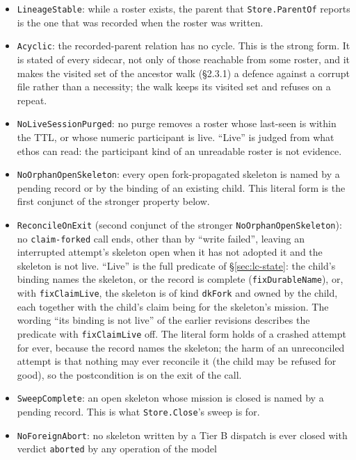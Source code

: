\documentclass[a4paper,10pt,fleqn]{article}
\newcommand{\field}[1]{\texttt{#1}}
\begin{document}
\begin{itemize}
  \item \field{LineageStable}: while a roster exists, the parent that
    \field{Store.ParentOf} reports is the one that was recorded when the
    roster was written.
  \item \field{Acyclic}: the recorded-parent relation has no cycle. This is
    the strong form. It is stated of every sidecar, not only of those
    reachable from some roster, and it makes the visited set of the
    ancestor walk (\S2.3.1) a defence against a corrupt file rather than a
    necessity; the walk keeps its visited set and refuses on a repeat.
  \item \field{NoLiveSessionPurged}: no purge removes a roster whose
    last-seen is within the TTL, or whose numeric participant is live.
    ``Live'' is judged from what ethos can read: the participant kind of an
    unreadable roster is not evidence.
  \item \field{NoOrphanOpenSkeleton}: every open fork-propagated skeleton is
    named by a pending record or by the binding of an existing child. This
    literal form is the first conjunct of the stronger property below.
  \item \field{ReconcileOnExit} (second conjunct of the stronger
    \field{NoOrphanOpenSkeleton}): no \field{claim-forked} call ends, other
    than by ``write failed'', leaving an interrupted attempt's skeleton open
    when it has not adopted it and the skeleton is not live. ``Live'' is the
    full predicate of \S\ref{sec:lc-state}: the child's binding names the
    skeleton, or the record is complete (\field{fixDurableName}), or, with
    \field{fixClaimLive}, the skeleton is of kind \field{dkFork} and owned by
    the child, each together with the child's claim being for the skeleton's
    mission. The wording ``its binding is not live'' of the earlier revisions
    describes the predicate with \field{fixClaimLive} off. The literal form
    holds of a crashed attempt for ever, because the record names the
    skeleton; the harm of an unreconciled attempt is that nothing may ever
    reconcile it (the child may be refused for good), so the postcondition
    is on the exit of the call.
  \item \field{SweepComplete}: an open skeleton whose mission is closed is
    named by a pending record. This is what \field{Store.Close}'s sweep is
    for.
  \item \field{NoForeignAbort}: no skeleton written by a Tier B dispatch is
    ever closed with verdict \field{aborted} by any operation of the model

\end{itemize}
\end{document}

